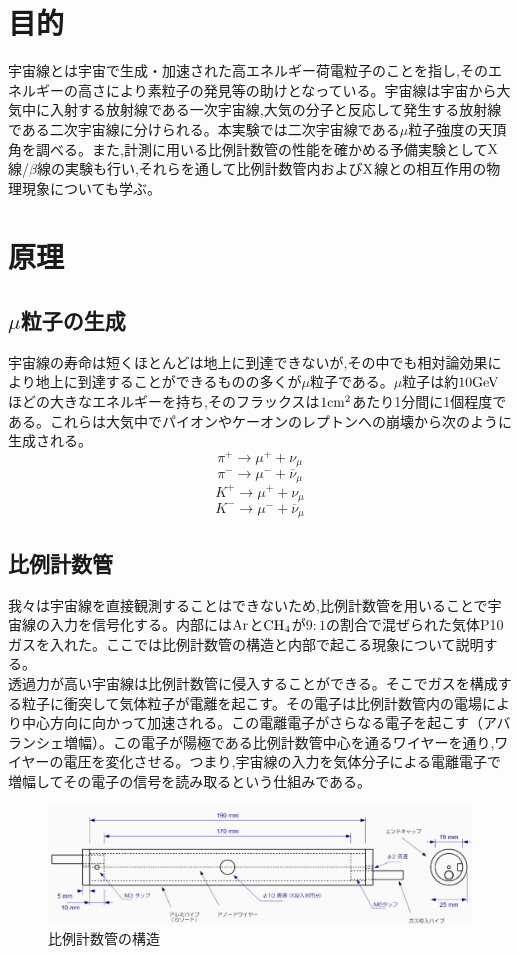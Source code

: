 \documentclass[a4j]{jsarticle}
\begin{document}
\section{目的}
宇宙線とは宇宙で生成・加速された高エネルギー荷電粒子のことを指し,そのエネルギーの高さにより素粒子の発見等の助けとなっている。宇宙線は宇宙から大気中に入射する放射線である一次宇宙線,大気の分子と反応して発生する放射線である二次宇宙線に分けられる。本実験では二次宇宙線である$\mu$粒子強度の天頂角を調べる。また,計測に用いる比例計数管の性能を確かめる予備実験として$\rm{X}$線/$\beta$線の実験も行い,それらを通して比例計数管内および$\rm{X}$線との相互作用の物理現象についても学ぶ。

\section{原理}
	\subsection{$\mu$粒子の生成}
	宇宙線の寿命は短くほとんどは地上に到達できないが,その中でも相対論効果により地上に到達することができるものの多くが$\mu$粒子である。$\mu$粒子は約$10\rm{GeV}$ほどの大きなエネルギーを持ち,そのフラックスは$1\rm{cm}^2$あたり1分間に1個程度である。これらは大気中でパイオンやケーオンのレプトンへの崩壊から次のように生成される。
	\[
	\pi^{+} \to \mu^{+} + \nu_{\mu}
	\]
	\[
	\pi^{-} \to \mu^{-} + \overline{\nu}_{\mu}
	\]
	\[
	K^{+} \to \mu^{+} + \nu_{\mu}
	\]
	\[
	K^{-} \to \mu^{-} + \overline{\nu}_{\mu}
	\]
	

	\subsection{比例計数管}
	我々は宇宙線を直接観測することはできないため,比例計数管を用いることで宇宙線の入力を信号化する。内部には$\rm{Ar}$と$\rm{CH_4}$が$9:1$の割合で混ぜられた気体P10ガスを入れた。ここでは比例計数管の構造と内部で起こる現象について説明する。\\
	\quad 透過力が高い宇宙線は比例計数管に侵入することができる。そこでガスを構成する粒子に衝突して気体粒子が電離を起こす。その電子は比例計数管内の電場により中心方向に向かって加速される。この電離電子がさらなる電子を起こす（アバランシェ増幅）。この電子が陽極である比例計数管中心を通るワイヤーを通り,ワイヤーの電圧を変化させる。つまり,宇宙線の入力を気体分子による電離電子で増幅してその電子の信号を読み取るという仕組みである。
	\begin{figure}[htbp]
	\centering
	\includegraphics[width=12cm]{proportionalcounter.png}
	\caption{比例計数管の構造}
	\end{figure}
	
\end{document}

